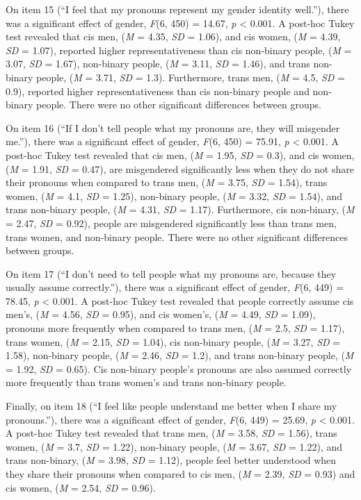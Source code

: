 \documentclass[12pt,twoside]{reedthesis}
\begin{document}
On item 15 (``I feel that my pronouns represent my gender identity well.''), there was a significant effect of gender, \emph{F}(6, 450) = 14.67, \emph{p} \textless{} 0.001. A post-hoc Tukey test revealed that cis men, (\emph{M} = 4.35, \emph{SD} = 1.06), and cis women, (\emph{M} = 4.39, \emph{SD} = 1.07), reported higher representativeness than cis non-binary people, (\emph{M} = 3.07, \emph{SD} = 1.67), non-binary people, (\emph{M} = 3.11, \emph{SD} = 1.46), and trans non-binary people, (\emph{M} = 3.71, \emph{SD} = 1.3). Furthermore, trans men, (\emph{M} = 4.5, \emph{SD} = 0.9), reported higher representativeness than cis non-binary people and non-binary people. There were no other significant differences between groups.

On item 16 (``If I don't tell people what my pronouns are, they will misgender me.''), there was a significant effect of gender, \emph{F}(6, 450) = 75.91, \emph{p} \textless{} 0.001. A post-hoc Tukey test revealed that cis men, (\emph{M} = 1.95, \emph{SD} = 0.3), and cis women, (\emph{M} = 1.91, \emph{SD} = 0.47), are misgendered significantly less when they do not share their pronouns when compared to trans men, (\emph{M} = 3.75, \emph{SD} = 1.54), trans women, (\emph{M} = 4.1, \emph{SD} = 1.25), non-binary people, (\emph{M} = 3.32, \emph{SD} = 1.54), and trans non-binary people, (\emph{M} = 4.31, \emph{SD} = 1.17). Furthermore, cis non-binary, (\emph{M} = 2.47, \emph{SD} = 0.92), people are misgendered significantly less than trans men, trans women, and non-binary people. There were no other significant differences between groups.

On item 17 (``I don't need to tell people what my pronouns are, because they usually assume correctly.''), there was a significant effect of gender, \emph{F}(6, 449) = 78.45, \emph{p} \textless{} 0.001. A post-hoc Tukey test revealed that people correctly assume cis men's, (\emph{M} = 4.56, \emph{SD} = 0.95), and cis women's, (\emph{M} = 4.49, \emph{SD} = 1.09), pronouns more frequently when compared to trans men, (\emph{M} = 2.5, \emph{SD} = 1.17), trans women, (\emph{M} = 2.15, \emph{SD} = 1.04), cis non-binary people, (\emph{M} = 3.27, \emph{SD} = 1.58), non-binary people, (\emph{M} = 2.46, \emph{SD} = 1.2), and trans non-binary people, (\emph{M} = 1.92, \emph{SD} = 0.65). Cis non-binary people's pronouns are also assumed correctly more frequently than trans women's and trans non-binary people.

Finally, on item 18 (``I feel like people understand me better when I share my pronouns.''), there was a significant effect of gender, \emph{F}(6, 449) = 25.69, \emph{p} \textless{} 0.001. A post-hoc Tukey test revealed that trans men, (\emph{M} = 3.58, \emph{SD} = 1.56), trans women, (\emph{M} = 3.7, \emph{SD} = 1.22), non-binary people, (\emph{M} = 3.67, \emph{SD} = 1.22), and trans non-binary, (\emph{M} = 3.98, \emph{SD} = 1.12), people feel better understood when they share their pronouns when compared to cis men, (\emph{M} = 2.39, \emph{SD} = 0.93) and cis women, (\emph{M} = 2.54, \emph{SD} = 0.96).
\end{document}
